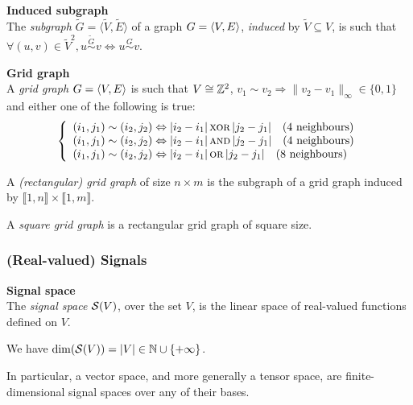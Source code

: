 \begin{definition}\textbf{Induced subgraph}\\
The \emph{subgraph} $\widetilde{G} = \langle \widetilde{V},\widetilde{E} \rangle$ of a graph $G = \langle V, E \rangle$, \emph{induced} by $\widetilde{V} \subseteq V$, is such that $\forall (u,v) \in \widetilde{V}^2, u \overset{\widetilde{G}}{\sim} v \Leftrightarrow u \overset{G}{\sim} v$.
\end{definition}

\begin{definition}\textbf{Grid graph}\\
A \emph{grid graph} $G = \langle V, E \rangle$ is 
such that $V \cong \mathbb{Z}^2$, $v_1 \sim v_2 \Rightarrow \|v_2 -v_1\|_\infty \in \{0, 1\}$ and either one of the following is true:
\begin{gather*}
\left\{
  \begin{array}{l}
    (i_1,j_1) \sim (i_2,j_2) \Leftrightarrow |i_2 - i_1| \operatorname{\textsc{xor}} |j_2 - j_1| \quad \text{($4$ neighbours)}\\
    (i_1,j_1) \sim (i_2,j_2) \Leftrightarrow |i_2 - i_1| \operatorname{\textsc{and}} |j_2 - j_1| \quad \text{($4$ neighbours)}\\
    (i_1,j_1) \sim (i_2,j_2) \Leftrightarrow |i_2 - i_1| \operatorname{\textsc{or}} |j_2 - j_1| \quad \text{($8$ neighbours)}
  \end{array}
\right.
\end{gather*}

A \emph{(rectangular) grid graph} of size $n \times m$ is the subgraph of a grid graph induced by $\llbracket 1, n \rrbracket \times \llbracket 1, m \rrbracket$.

A \emph{square grid graph} is a rectangular grid graph of square size.
\end{definition}

\subsubsection{(Real-valued) Signals}

\begin{definition}\textbf{Signal space}\\
The \emph{signal space} $\mathcal{S}(V)$, over the set $V$, is the linear space of real-valued functions defined on $V$.
\end{definition}

We have $\dim(\mathcal{S}(V)) = |V| \in \mathbb{N} \cup \{+\infty\}$.

\begin{remark}
In particular, a vector space, and more generally a tensor space, are finite-dimensional signal spaces over any of their bases.
\end{remark}

